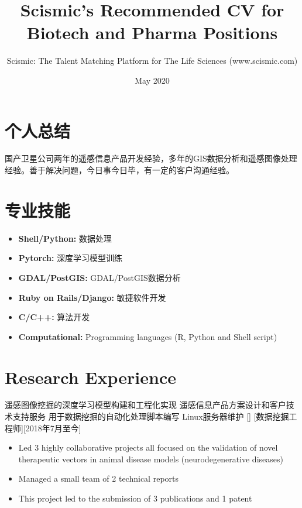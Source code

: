\documentclass{article}
\title{Scismic's Recommended CV for Biotech and Pharma Positions}
\author{Scismic: The Talent Matching Platform for The Life Sciences (www.scismic.com)}
\date{May 2020}
\begin{document}

\makecvtitle %

\section{个人总结}
国产卫星公司两年的遥感信息产品开发经验，多年的GIS数据分析和遥感图像处理经验。善于解决问题，今日事今日毕，有一定的客户沟通经验。 
 
\section{专业技能}

\begin{itemize}
\item \textbf{Shell/Python:} 数据处理
\item \textbf{Pytorch:} 深度学习模型训练
\item \textbf{GDAL/PostGIS:} GDAL/PostGIS数据分析
\item \textbf{Ruby on Rails/Django:} 敏捷软件开发
\item \textbf{C/C++:} 算法开发
\item \textbf{Computational:} Programming languages (R, Python and Shell script)
\end{itemize}
 
\section{Research Experience}
遥感图像挖掘的深度学习模型构建和工程化实现
遥感信息产品方案设计和客户技术支持服务
用于数据挖掘的自动化处理脚本编写
Linux服务器维护
[]
[数据挖掘工程师][2018年7月至今]

\begin{itemize}
\item Led 3 highly collaborative projects all focused on the validation of novel therapeutic vectors in animal disease models (neurodegenerative diseases)
\item Managed a small team of 2 technical reports
\item This project led to the submission of 3 publications and 1 patent
\end{itemize}
\end{document}
